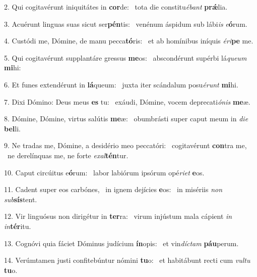 2. Qui cogitavérunt iniquitátes in \textbf{cor}de: \ast\  tota die constitu\textit{é}\textit{bant} \textbf{prǽ}lia.\

3. Acuérunt linguas suas sicut ser\textbf{pén}tis: \ast\  venénum áspidum sub lábi\textit{is} \textit{e}\textbf{ó}rum.\

4. Custódi me, Dómine, de manu pecca\textbf{tó}ris: \ast\  et ab homínibus iníquis \textit{é}\textit{ri}\textbf{pe} me.\

5. Qui cogitavérunt supplantáre gressus \textbf{me}os: \ast\  abscondérunt supérbi lá\textit{que}\textit{um} \textbf{mi}hi:\

6. Et funes extendérunt in \textbf{lá}queum: \ast\  juxta iter scándalum posu\textit{é}\textit{runt} \textbf{mi}hi.\

7. Dixi Dómino: Deus meus \textbf{es} tu: \ast\  exáudi, Dómine, vocem deprecati\textit{ó}\textit{nis} \textbf{me}æ.\

8. Dómine, Dómine, virtus salútis \textbf{me}æ: \ast\  obumbrásti super caput meum in \textit{di}\textit{e} \textbf{bel}li.\

9. Ne tradas me, Dómine, a desidério meo peccatóri: \dag\  cogitavérunt \textbf{con}tra me, \ast\  ne derelínquas me, ne forte \textit{ex}\textit{al}\textbf{tén}tur.\

10. Caput circúitus e\textbf{ó}rum: \ast\  labor labiórum ipsórum opé\textit{ri}\textit{et} \textbf{e}os.\

11. Cadent super eos carbónes, \dag\  in ignem dejícies \textbf{e}os: \ast\  in misériis \textit{non} \textit{sub}\textbf{sís}tent.\

12. Vir linguósus non dirigétur in \textbf{ter}ra: \ast\  virum injústum mala cápient \textit{in} \textit{in}\textbf{tér}itu.\

13. Cognóvi quia fáciet Dóminus judícium \textbf{ín}opis: \ast\  et vin\textit{díc}\textit{tam} \textbf{páu}perum.\

14. Verúmtamen justi confitebúntur nómini \textbf{tu}o: \ast\  et habitábunt recti cum \textit{vul}\textit{tu} \textbf{tu}o.\

